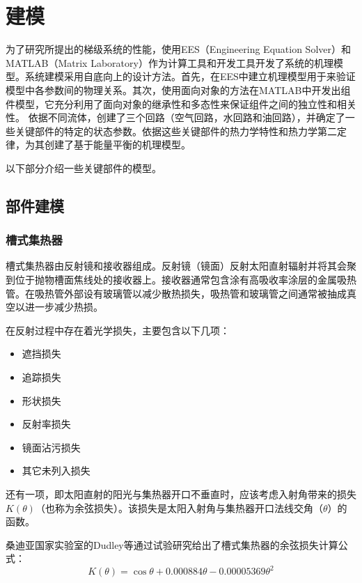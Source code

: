 \chapter{建模}
\label{cha:Modeling}

为了研究所提出的梯级系统的性能，使用EES（Engineering Equation Solver）和MATLAB（Matrix Laboratory）作为计算工具和开发工具开发了系统的机理模型。系统建模采用自底向上的设计方法。首先，在EES中建立机理模型用于来验证模型中各参数间的物理关系。其次，使用面向对象的方法在MATLAB中开发出组件模型，它充分利用了面向对象的继承性和多态性来保证组件之间的独立性和相关性。
依据不同流体，创建了三个回路（空气回路，水回路和油回路），并确定了一些关键部件的特定的状态参数。依据这些关键部件的热力学特性和热力学第二定律，为其创建了基于能量平衡的机理模型。

以下部分介绍一些关键部件的模型。
\section{部件建模}
\subsection{槽式集热器}
\label{sec:ptc}

槽式集热器由反射镜和接收器组成。反射镜（镜面）反射太阳直射辐射并将其会聚到位于抛物槽面焦线处的接收器上。接收器通常包含涂有高吸收率涂层的金属吸热管。在吸热管外部设有玻璃管以减少散热损失，吸热管和玻璃管之间通常被抽成真空以进一步减少热损。

在反射过程中存在着光学损失，主要包含以下几项\cite{Price2002}：

\begin{itemize}
  \item 遮挡损失
  \item 追踪损失
  \item 形状损失
  \item 反射率损失
  \item 镜面沾污损失
  \item 其它未列入损失
\end{itemize}

还有一项，即太阳直射的阳光与集热器开口不垂直时，应该考虑入射角带来的损失$K(\theta)$（也称为余弦损失）。该损失是太阳入射角与集热器开口法线交角（$\theta$）的函数。

桑迪亚国家实验室的Dudley等\cite{Dudley1994}通过试验研究给出了槽式集热器的余弦损失计算公式：
\begin{equation}
  K(\theta) = \cos\theta+0.000884\theta-0.00005369\theta^2
\end{equation}

